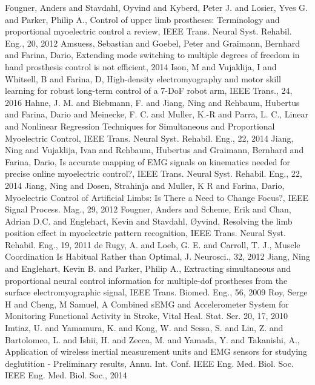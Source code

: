 \begin{multicols}{2}
	\begin{thebibliography}{99}				
		 Fougner, Anders and Stavdahl, Oyvind and Kyberd, Peter J. and Losier, Yves G. and Parker, Philip A., Control of upper limb prostheses: Terminology and proportional myoelectric control a review, IEEE Trans. Neural Syst. Rehabil. Eng., 20, 2012
		 Amsuess, Sebastian and Goebel, Peter and Graimann, Bernhard and Farina, Dario, Extending mode switching to multiple degrees of freedom in hand prosthesis control is not efficient, 2014
		 Ison, M and Vujaklija, I and Whitsell, B and Farina, D, High-density electromyography and motor skill learning for robust long-term control of a 7-DoF robot arm, IEEE Trans., 24, 2016
		 Hahne, J. M. and Biebmann, F. and Jiang, Ning and Rehbaum, Hubertus and Farina, Dario and Meinecke, F. C. and Muller, K.-R and Parra, L. C., Linear and Nonlinear Regression Techniques for Simultaneous and Proportional Myoelectric Control, IEEE Trans. Neural Syst. Rehabil. Eng., 22, 2014
		 Jiang, Ning and Vujaklija, Ivan and Rehbaum, Hubertus and Graimann, Bernhard and Farina, Dario, Is accurate mapping of EMG signals on kinematics needed for precise online myoelectric control?, IEEE Trans. Neural Syst. Rehabil. Eng., 22, 2014
		 Jiang, Ning and Dosen, Strahinja and Muller, K R and Farina, Dario, Myoelectric Control of Artificial Limbs: Is There a Need to Change Focus?, IEEE Signal Process. Mag., 29, 2012
		 Fougner, Anders and Scheme, Erik and Chan, Adrian D.C. and Englehart, Kevin and Stavdahl, {\O}yvind, Resolving the limb position effect in myoelectric pattern recognition, IEEE Trans. Neural Syst. Rehabil. Eng., 19, 2011
		 de Rugy, A. and Loeb, G. E. and Carroll, T. J., Muscle Coordination Is Habitual Rather than Optimal, J. Neurosci., 32, 2012
		 Jiang, Ning and Englehart, Kevin B. and Parker, Philip A., Extracting simultaneous and proportional neural control information for multiple-dof prostheses from the surface electromyographic signal, IEEE Trans. Biomed. Eng., 56, 2009
		 Roy, Serge H and Cheng, M Samuel, A Combined sEMG and Accelerometer System for Monitoring Functional Activity in Stroke, Vital Heal. Stat. Ser. 20, 17, 2010
		 Imtiaz, U. and Yamamura, K. and Kong, W. and Sessa, S. and Lin, Z. and Bartolomeo, L. and Ishii, H. and Zecca, M. and Yamada, Y. and Takanishi, A., Application of wireless inertial measurement units and EMG sensors for studying deglutition - Preliminary results, Annu. Int. Conf. IEEE Eng. Med. Biol. Soc. IEEE Eng. Med. Biol. Soc., 2014

\end{thebibliography}
\end{multicols}
